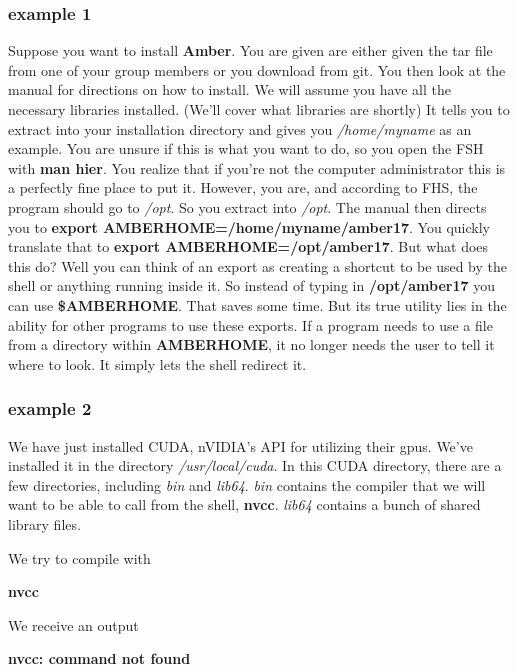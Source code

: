 \documentclass{article}
\begin{document}
\subsubsection*{example 1}
Suppose you want to install \textbf{Amber}. 
You are given are either given the tar file from one of your group members or you download from git.
You then look at the manual for directions on how to install.
We will assume you have all the necessary libraries installed. (We'll cover what libraries are shortly)
It tells you to extract into your installation directory and gives you \textit{/home/myname} as an example.
You are unsure if this is what you want to do, so you open the FSH with \textbf{man hier}.
You realize that if you're not the computer administrator this is a perfectly fine place to put it.
However, you are, and according to FHS, the program should go to \textit{/opt}.
So you extract into \textit{/opt}.
The manual then directs you to \textbf{export AMBERHOME=/home/myname/amber17}.
You quickly translate that to \textbf{export AMBERHOME=/opt/amber17}.
But what does this do?
Well you can think of an export as creating a shortcut to be used by the shell or anything running inside it.
So instead of typing in \textbf{/opt/amber17} you can use \textbf{\$AMBERHOME}.
That saves some time. 
But its true utility lies in the ability for other programs to use these exports.
If a program needs to use a file from a directory within \textbf{AMBERHOME}, it no longer needs the user to tell it where to look.
It simply lets the shell redirect it.

\subsubsection*{example 2}
We have just installed CUDA, nVIDIA's API for utilizing their gpus.
We've installed it in the directory \textit{/usr/local/cuda}.
In this CUDA directory, there are a few directories, including  \textit{bin} and \emph{lib64}.
\textit{bin} contains the compiler that we will want to be able to call from the shell, \textbf{nvcc}.
\textit{lib64} contains a bunch of shared library files.

We try to compile with \smallskip \\

\centerline{\textbf{nvcc}} \smallskip

\hfill

We receive an output \smallskip \\

\centerline{\textbf{nvcc: command not found}} \smallskip 
\end{document}
